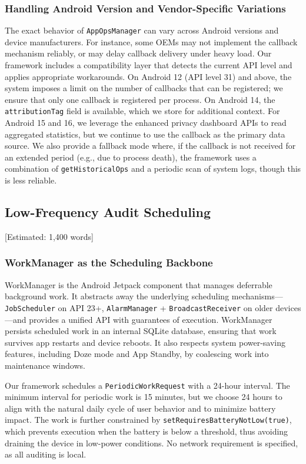 \subsubsection{Handling Android Version and Vendor-Specific Variations}

The exact behavior of \texttt{AppOpsManager} can vary across Android versions and device manufacturers. For instance, some OEMs may not implement the callback mechanism reliably, or may delay callback delivery under heavy load. Our framework includes a compatibility layer that detects the current API level and applies appropriate workarounds. On Android 12 (API level 31) and above, the system imposes a limit on the number of callbacks that can be registered; we ensure that only one callback is registered per process. On Android 14, the \texttt{attributionTag} field is available, which we store for additional context. For Android 15 and 16, we leverage the enhanced privacy dashboard APIs to read aggregated statistics, but we continue to use the callback as the primary data source. We also provide a fallback mode where, if the callback is not received for an extended period (e.g., due to process death), the framework uses a combination of \texttt{getHistoricalOps} and a periodic scan of system logs, though this is less reliable.

\subsection{Low-Frequency Audit Scheduling} [Estimated: 1,400 words]

\subsubsection{WorkManager as the Scheduling Backbone}

WorkManager is the Android Jetpack component that manages deferrable background work. It abstracts away the underlying scheduling mechanisms—\texttt{JobScheduler} on API 23+, \texttt{AlarmManager} + \texttt{BroadcastReceiver} on older devices—and provides a unified API with guarantees of execution. WorkManager persists scheduled work in an internal SQLite database, ensuring that work survives app restarts and device reboots. It also respects system power-saving features, including Doze mode and App Standby, by coalescing work into maintenance windows.

Our framework schedules a \texttt{PeriodicWorkRequest} with a 24-hour interval. The minimum interval for periodic work is 15 minutes, but we choose 24 hours to align with the natural daily cycle of user behavior and to minimize battery impact. The work is further constrained by \texttt{setRequiresBatteryNotLow(true)}, which prevents execution when the battery is below a threshold, thus avoiding draining the device in low-power conditions. No network requirement is specified, as all auditing is local.

